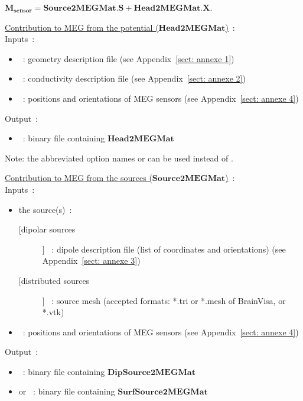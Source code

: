  $\mathbf{M_{sensor}} = \mathbf{Source2MEGMat} . \mathbf{S} + \mathbf{Head2MEGMat}.\mathbf{X}$.

\medskip

\noindent
\underline{Contribution to MEG from the potential ($\mathbf{Head2MEGMat}$)}~:\\
Inputs~:
\begin{itemize}
    \item {}~: geometry description file (see Appendix~\ref{sect: annexe 1})
    \item {}~: conductivity description file (see Appendix~\ref{sect: annexe 2})
    \item {}~: positions and orientations of MEG sensors (see Appendix~\ref{sect: annexe 4})
\end{itemize}
Output~:
\begin{itemize}
    \item {}~: binary file containing $\mathbf{Head2MEGMat}$
\end{itemize}

\medskip

\noindent
{}
\medskip
Note:  the abbreviated option names  or  can be used instead of .

\bigskip

\noindent
\underline{Contribution to MEG from the sources ($\mathbf{Source2MEGMat}$)}~:\\
Inputs~:
\begin{itemize}
    \item the source(s)~:
    \begin{description}
        \item [[dipolar sources]] ~:  dipole description file (list of coordinates and orientations) (see Appendix~\ref{sect: annexe 3}) 
        \item [[distributed sources]] ~:  source mesh (accepted formats:  *.tri or *.mesh of BrainVisa, or *.vtk) 
    \end{description}
    \item {}~: positions and orientations of MEG sensors (see Appendix~\ref{sect: annexe 4})
\end{itemize}
Output~: 
\begin{itemize}
    \item {}~: binary file containing $\mathbf{DipSource2MEGMat}$ \\
\item or ~: binary file containing $\mathbf{SurfSource2MEGMat}$ 
\end{itemize}

